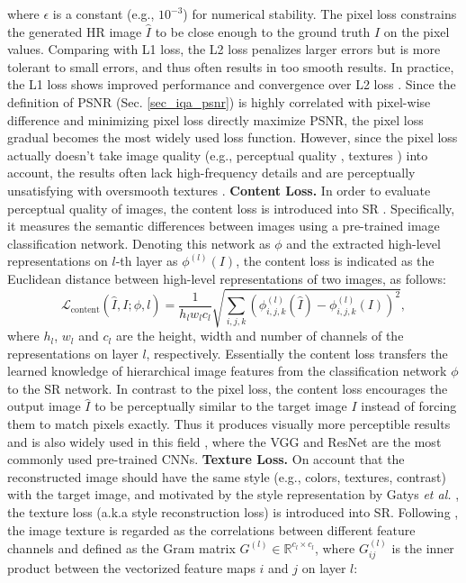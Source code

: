 {where $\epsilon$ is a constant (e.g., $10^{-3}$) for numerical stability.
The pixel loss constrains the generated HR image $\hat{I}$ to be close enough to the ground truth $I$ on the pixel values.
Comparing with L1 loss, the L2 loss penalizes larger errors but is more tolerant to small errors, and thus often results in too smooth results.
In practice, the L1 loss shows improved performance and convergence over L2 loss .
Since the definition of PSNR (Sec. \ref{sec_iqa_psnr}) is highly correlated with pixel-wise difference and minimizing pixel loss directly maximize PSNR, the pixel loss gradual becomes the most widely used loss function.
However, since the pixel loss actually doesn't take image quality (e.g., perceptual quality , textures ) into account, the results often lack high-frequency details and are perceptually unsatisfying with oversmooth textures .
\textbf{Content Loss.}
In order to evaluate perceptual quality of images, the content loss is introduced into SR .
Specifically, it measures the semantic differences between images using a pre-trained image classification network.
Denoting this network as $\phi$ and the extracted high-level representations on $l$-th layer as $\phi^{(l)}(I)$, the content loss is indicated as the Euclidean distance between high-level representations of two images, as follows:
\begin{equation}
    \mathcal{L}_{\text{content}} (\hat{I}, I ; \phi, l) = \frac{1}{h_l w_l c_l} \sqrt{\sum_{i,j,k} (\phi^{(l)}_{i,j,k}(\hat{I}) - \phi^{(l)}_{i,j,k}(I))^2} ,
\end{equation}
where $h_l$, $w_l$ and $c_l$ are the height, width and number of channels of the representations on layer $l$, respectively.
Essentially the content loss transfers the learned knowledge of hierarchical image features from the classification network $\phi$ to the SR network.
In contrast to the pixel loss, the content loss encourages the output image $\hat{I}$ to be perceptually similar to the target image $I$ instead of forcing them to match pixels exactly.
Thus it produces visually more perceptible results and is also widely used in this field , where the VGG  and ResNet  are the most commonly used pre-trained CNNs.
\textbf{Texture Loss.}
On account that the reconstructed image should have the same style (e.g., colors, textures, contrast) with the target image, and motivated by the style representation by Gatys \textit{et al.} , the texture loss (a.k.a style reconstruction loss) is introduced into SR.
Following , the image texture is regarded as the correlations between different feature channels and defined as the Gram matrix $G^{(l)} \in \mathbb{R}^{c_l \times c_l}$, where $G^{(l)}_{ij}$ is the inner product between the vectorized feature maps $i$ and $j$ on layer $l$:
}
